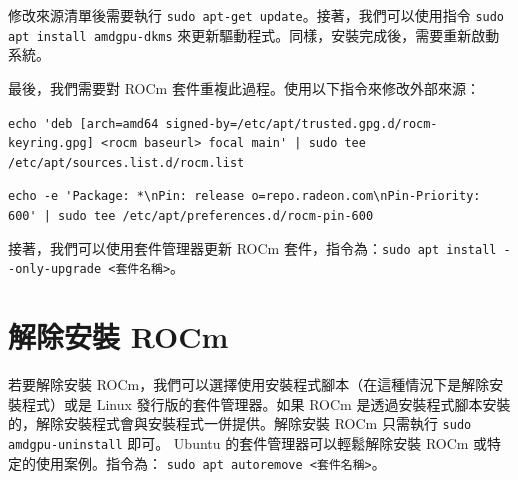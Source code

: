 修改來源清單後需要執行 \lstinline|sudo apt-get update|。接著，我們可以使用指令 \lstinline|sudo apt install amdgpu-dkms| 來更新驅動程式。同樣，安裝完成後，需要重新啟動系統。

最後，我們需要對 ROCm 套件重複此過程。使用以下指令來修改外部來源：

\lstinline!echo 'deb [arch=amd64 signed-by=/etc/apt/trusted.gpg.d/rocm-keyring.gpg] <rocm baseurl> focal main' | sudo tee /etc/apt/sources.list.d/rocm.list!

\lstinline!echo -e 'Package: *\nPin: release o=repo.radeon.com\nPin-Priority: 600' | sudo tee /etc/apt/preferences.d/rocm-pin-600!

接著，我們可以使用套件管理器更新 ROCm 套件，指令為：\lstinline|sudo apt install --only-upgrade <套件名稱>|。

\section{解除安裝 ROCm}
若要解除安裝 ROCm，我們可以選擇使用安裝程式腳本（在這種情況下是解除安裝程式）或是 Linux 發行版的套件管理器。如果 ROCm 是透過安裝程式腳本安裝的，解除安裝程式會與安裝程式一併提供。解除安裝 ROCm 只需執行 \lstinline|sudo amdgpu-uninstall| 即可。
Ubuntu 的套件管理器可以輕鬆解除安裝 ROCm 或特定的使用案例。指令為：
\lstinline|sudo apt autoremove <套件名稱>|。


